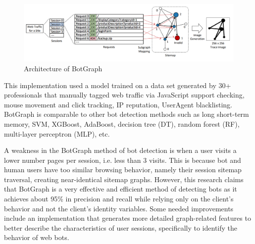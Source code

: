 \begin{figure}[!h]
    \includegraphics[width=1\columnwidth]{figures/BotGraph_fig1}
    \caption{Architecture of BotGraph}
    \label{fig:botgraph}
\end{figure}
This implementation used a model trained on a data set generated by 30+ professionals that manually tagged web traffic via JavaScript support checking, mouse movement and click tracking, IP reputation, UserAgent blacklisting.
BotGraph is comparable to other bot detection methods such as long short-term memory, SVM, XGBoost, AdaBoost, decision tree (DT), random forest (RF), multi-layer perceptron (MLP), etc.

A weakness in the BotGraph method of bot detection is when a user visits a lower number pages per session, i.e. less than 3 visits.
This is because bot and human users have too similar browsing behavior, namely their session sitemap traversal, creating near-identical sitemap graphs.
However, this research claims that BotGraph is a very effective and efficient method of detecting bots as it achieves about 95\% in precision and recall while relying only on the client's behavior and not the client's identity variables.
Some needed improvements include an implementation that generates more detailed graph-related features to better describe the characteristics of user sessions, specifically to identify the behavior of web bots.

